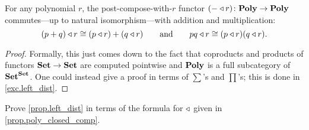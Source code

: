 \documentclass[Book-Poly]{subfiles}
\begin{document}
\begin{proposition}\label{prop.left_dist}
For any polynomial $r$, the post-compose-with-$r$ functor $(-\mathbin{\triangleleft} r)\colon\mathbf{Poly}\to\mathbf{Poly}$ commutes---up to natural isomorphism---with addition and multiplication:
\[
  (p+q)\mathbin{\triangleleft} r\cong (p\mathbin{\triangleleft} r)+(q\mathbin{\triangleleft} r)
  \qquad\text{and}\qquad
  pq\mathbin{\triangleleft} r\cong (p\mathbin{\triangleleft} r)(q\mathbin{\triangleleft} r).
\]
\end{proposition} 
\begin{proof}
Formally, this just comes down to the fact that coproducts and products of functors $\mathbf{Set}\to\mathbf{Set}$ are computed pointwise and $\mathbf{Poly}$ is a full subcategory of $\mathbf{Set}^{\mathbf{Set}}$. One could instead give a proof in terms of $\sum$'s and $\prod$'s; this is done in \cref{exc.left_dist}.
\end{proof}

\begin{exercise}\label{exc.left_dist}
Prove \cref{prop.left_dist} in terms of the formula for $\mathbin{\triangleleft}$ given in \cref{prop.poly_closed_comp}.
\end{exercise}
\end{document}
